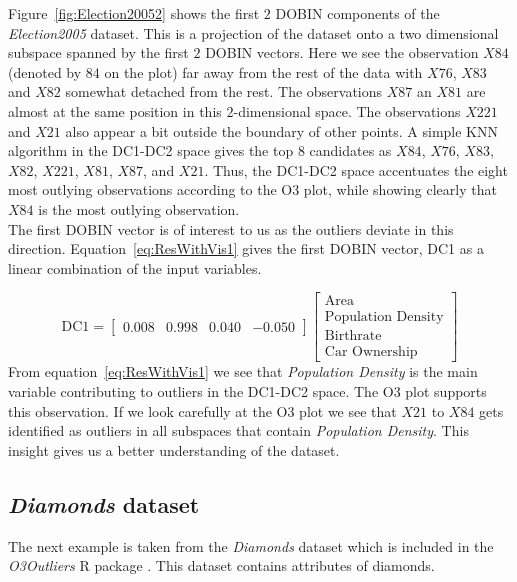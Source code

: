 \documentclass[11pt]{article}
\begin{document}
Figure~\ref{fig:Election20052} shows the first $2$ DOBIN components of the \textit{Election2005} dataset. This is a projection of the dataset onto a two dimensional subspace spanned by the first $2$ DOBIN vectors. Here we see the observation $X84$ (denoted by $84$ on the plot) far away from the rest of the data with $X76$, $X83$ and $X82$ somewhat detached from the rest. The observations $X87$ an $X81$ are almost at the same position in this $2$-dimensional space. The observations $X221$ and $X21$ also appear a bit outside the boundary of  other points. A simple KNN algorithm in the DC1-DC2 space gives the top $8$ candidates as $X84$, $X76$,  $X83$, $X82$, $X221$, $X81$, $X87$, and  $X21$. Thus, the DC1-DC2 space accentuates the eight most outlying observations according to the O3 plot, while showing clearly that $X84$ is the most outlying observation. \\

The first DOBIN vector is of interest to us as the outliers deviate in this direction. Equation~\eqref{eq:ResWithVis1} gives the first DOBIN vector,   DC1 as a linear combination of the input variables. 

\begin{equation}\label{eq:ResWithVis1}
    \text{DC1} = \begin{bmatrix}
    0.008 & 0.998 & 0.040 & -0.050  
    \end{bmatrix}
    \begin{bmatrix}
    \text{Area} \\
    \text{Population Density} \\
    \text{Birthrate} \\
    \text{Car Ownership}
    \end{bmatrix}
\end{equation}
From equation~\eqref{eq:ResWithVis1} we see that \textit{Population Density} is the main variable contributing to outliers in the DC1-DC2 space. The O3 plot supports this observation. If we look carefully at the O3 plot we see that $X21$ to $X84$ gets identified as outliers in  all subspaces that contain \textit{Population Density}.  This insight gives us a better understanding of the dataset. 

\subsection{\textit{Diamonds} dataset}\label{sec:ResWithVis2}
The next example is taken from the \textit{Diamonds} dataset \citep{ggplot2} which is included in the \textit{O3Outliers} R package \citep{O3Rpack}. This dataset contains attributes of diamonds.   \\ 
\end{document}

